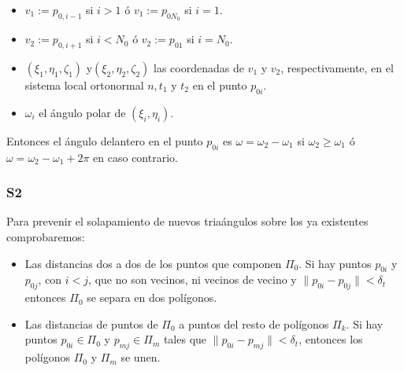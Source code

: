 \begin{itemize}
	\item $v_1 := p_{0,i-1}$ si $i>1$ ó $v_1 := p_{0N_0}$ si $i=1$.
	\item $v_2 := p_{0,i+1}$ si $i<N_0$ ó $v_2 := p_{01}$ si $i=N_0$.
	\item $(\xi_1,\eta_1,\zeta_1)$ y$(\xi_2,\eta_2,\zeta_2)$ las coordenadas de $v_1$ y $v_2$, respectivamente, en el sistema local ortonormal $n, t_1$ y $t_2$ en el punto $p_{0i}$.
	\item $\omega_i$ el ángulo polar de $(\xi_i, \eta_i)$. 
\end{itemize}

Entonces el ángulo delantero en el punto $p_{0i}$ es $\omega = \omega_2 - \omega_1$ si $\omega_2 \geq \omega_1$ ó $\omega = \omega_2 - \omega_1 + 2\pi$ en caso contrario.

\subsubsection{S2}

Para prevenir el solapamiento de nuevos triaángulos sobre los ya existentes comprobaremos:

\begin{itemize}
\item Las distancias dos a dos de los puntos que componen $\Pi_0$. Si hay puntos $p_{0i}$ y $p_{0j}$, con $i<j$, que no son vecinos, ni vecinos de vecino y $\| p_{0i} - p_{0j} \| < \delta_t$ entonces $\Pi_0$ se separa en dos polígonos.
\item Las distancias de puntos de $\Pi_0$ a puntos del resto de polígonos $\Pi_k$. Si hay puntos $p_{0i} \in \Pi_0$ y $p_{mj} \in \Pi_m$ tales que $\| p_{0i} - p_{mj} \| < \delta_t$, entonces los polígonos $\Pi_0$ y $\Pi_m$ se unen.
\end{itemize}

